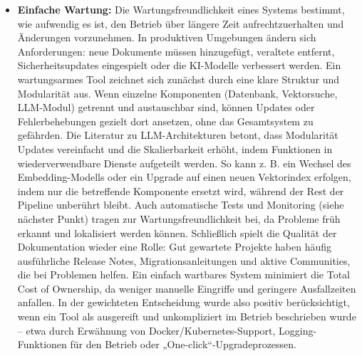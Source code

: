 \begin{itemize}
    \item \textbf{Einfache Wartung:} Die Wartungsfreundlichkeit eines Systems bestimmt, wie aufwendig es ist, den Betrieb über längere Zeit aufrechtzuerhalten und Änderungen vorzunehmen. In produktiven Umgebungen ändern sich Anforderungen: neue Dokumente müssen hinzugefügt, veraltete entfernt, Sicherheitsupdates eingespielt oder die KI-Modelle verbessert werden. Ein wartungsarmes Tool zeichnet sich zunächst durch eine klare Struktur und Modularität aus. Wenn einzelne Komponenten (Datenbank, Vektorsuche, LLM-Modul) getrennt und austauschbar sind, können Updates oder Fehlerbehebungen gezielt dort ansetzen, ohne das Gesamtsystem zu gefährden. Die Literatur zu LLM-Architekturen betont, dass Modularität Updates vereinfacht und die Skalierbarkeit erhöht, indem Funktionen in wiederverwendbare Dienste aufgeteilt werden. So kann z. B. ein Wechsel des Embedding-Modells oder ein Upgrade auf einen neuen Vektorindex erfolgen, indem nur die betreffende Komponente ersetzt wird, während der Rest der Pipeline unberührt bleibt. Auch automatische Tests und Monitoring (siehe nächster Punkt) tragen zur Wartungsfreundlichkeit bei, da Probleme früh erkannt und lokalisiert werden können. Schließlich spielt die Qualität der Dokumentation wieder eine Rolle: Gut gewartete Projekte haben häufig ausführliche Release Notes, Migrationsanleitungen und aktive Communities, die bei Problemen helfen. Ein einfach wartbares System minimiert die Total Cost of Ownership, da weniger manuelle Eingriffe und geringere Ausfallzeiten anfallen. In der gewichteten Entscheidung wurde also positiv berücksichtigt, wenn ein Tool als ausgereift und unkompliziert im Betrieb beschrieben wurde – etwa durch Erwähnung von Docker/Kubernetes-Support, Logging-Funktionen für den Betrieb oder „One-click“-Upgradeprozessen.

\end{itemize}
